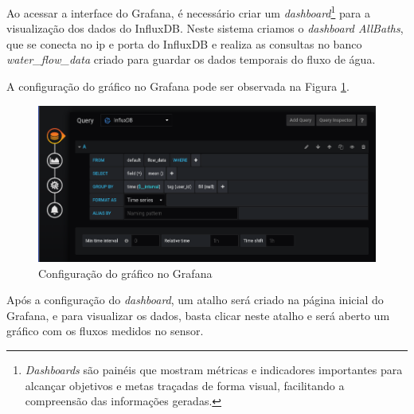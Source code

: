 Ao acessar a interface do Grafana, é necessário criar um \textit{dashboard}\footnote{\textit{Dashboards} são painéis que mostram métricas e indicadores importantes para alcançar objetivos e metas traçadas de forma visual, facilitando a compreensão das informações geradas.} para a visualização dos dados do InfluxDB. Neste sistema criamos o \textit{dashboard AllBaths}, que se conecta no ip e porta do InfluxDB e realiza as consultas no banco \textit{water\_flow\_data} criado para guardar os dados temporais do fluxo de água.

A configuração do gráfico no Grafana pode ser observada na Figura \ref{fig:grafanaconf}.

\begin{figure}[htbp]
	\centering
	\includegraphics[width=1\linewidth]{figuras/grafanaconf.png}
	\caption{Configuração do gráfico no Grafana}
	\label{fig:grafanaconf}
\end{figure}

\newpage

Após a configuração do \textit{dashboard}, um atalho será criado na página inicial do Grafana, e para visualizar os dados, basta clicar neste atalho e será aberto um gráfico com os fluxos medidos no sensor.

